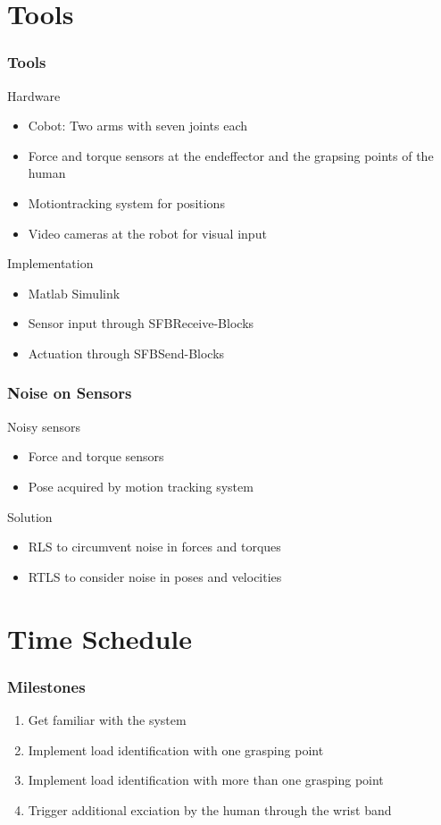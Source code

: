 \documentclass[student,noshadow]{ITRslides}
\begin{document}
\section{Tools}
\begin{frame}
	\frametitle{Tools}
	\begin{block}{Hardware}
		\begin{itemize}
			\item Cobot: Two arms with seven joints each
			\item Force and torque sensors at the endeffector and the grapsing points of the human
			\item Motiontracking system for positions
			\item Video cameras at the robot for visual input
		\end{itemize}
	\end{block}
	\begin{block}{Implementation}
		\begin{itemize}
			\item Matlab Simulink
			\item Sensor input through SFBReceive-Blocks
			\item Actuation through SFBSend-Blocks
		\end{itemize}
	\end{block}
\end{frame}

\begin{frame}
	\frametitle{Noise on Sensors}
	\begin{block}{Noisy sensors}
		\begin{itemize}
			\item Force and torque sensors
			\item Pose acquired by motion tracking system 
		\end{itemize}
	\end{block}
	\begin{block}{Solution}
		\begin{itemize}
			\item RLS to circumvent noise in forces and torques
			\item RTLS to consider noise in poses and velocities
		\end{itemize}
	\end{block}
\end{frame}

\section{Time Schedule}
\begin{frame}
	\frametitle{Milestones}
	\begin{enumerate}
		\item Get familiar with the system
		\item Implement load identification with one grasping point
		\item Implement load identification with more than one grasping point
		\item Trigger additional exciation by the human through the wrist band
	\end{enumerate}
\end{frame}
\end{document}
